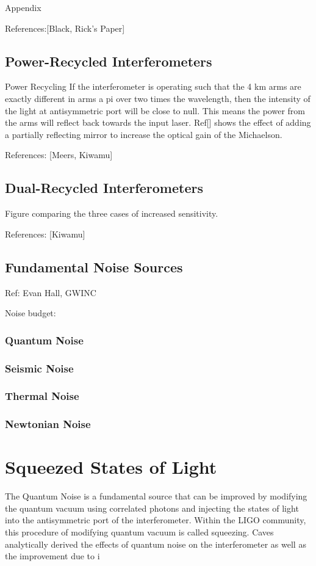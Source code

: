 \documentclass[oneside]{book}
\begin{document}
		Appendix

		References:[Black, Rick's Paper]

		\subsection{Power-Recycled Interferometers}
		Power Recycling
		If the interferometer is operating such that the 4 km arms are exactly different in arms a pi over two times the wavelength, then the intensity of the light at antisymmetric port will be close to null.  This means the power from the arms will reflect back towards the input laser.  Ref[] shows the effect of adding a partially reflecting mirror to increase the optical gain of the Michaelson.
		
		References: [Meers, Kiwamu]
		
		\subsection{Dual-Recycled Interferometers}
		
		
		Figure comparing the three cases of increased sensitivity.
		
		References: [Kiwamu]
		
		\subsection{Fundamental Noise Sources}
		Ref: Evan Hall, GWINC

		Noise budget:

		\subsubsection{Quantum Noise}
		\subsubsection{Seismic Noise}
		\subsubsection{Thermal Noise}
		\subsubsection{Newtonian Noise}

	
	
	\section{Squeezed States of Light}
	The Quantum Noise is a fundamental source that can be improved by modifying the quantum vacuum using correlated photons and injecting the states of light into the antisymmetric port of the interferometer.  Within the LIGO community, this procedure of modifying quantum vacuum is called squeezing. Caves analytically derived the effects of quantum noise on the interferometer as well as the improvement due to i
	
\end{document}
